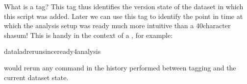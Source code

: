 \begin{findoutmore}[label={fom-what-is-a-tag}, before title={\thetcbcounter\ }, float, floatplacement=tb, check odd page=true]{What is a tag?}
\sphinxAtStartPar
This tag thus identifies the version state of the dataset in which this script
was added.
Later we can use this tag to identify the point in time at which
the analysis setup was ready \textendash{} much more intuitive than a 40\sphinxhyphen{}character shasum!
This is handy in the context of a , for example:

\begin{sphinxVerbatim}[commandchars=\\\{\}]
dataladrerun\PYGZhy{}\PYGZhy{}sinceready4analysis
\end{sphinxVerbatim}

\sphinxAtStartPar
would rerun any  command in the history performed between tagging
and the current dataset state.


\end{findoutmore}

